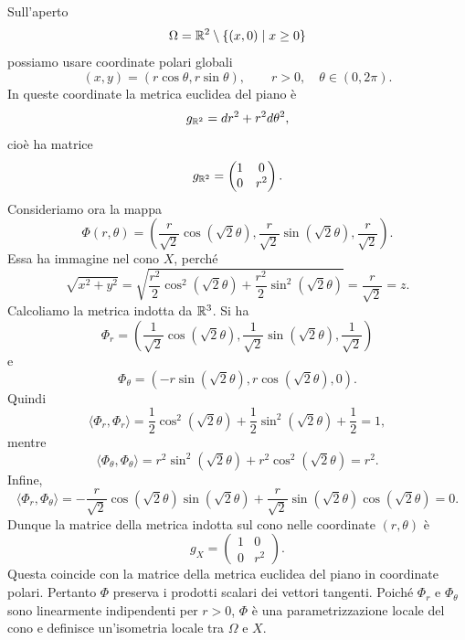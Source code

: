\documentclass[a4paper]{article}
\begin{document}
\begin{snippetsolution}{}
    Sull'aperto
    \[
        \Omega=\mathbb{R}^2\setminus\{(x,0)\mid x\geq0\}
    \]
    possiamo usare coordinate polari globali
    \[
        (x,y)=(r\cos\theta,r\sin\theta),
        \qquad
        r>0,\quad \theta\in(0,2\pi).
    \]
    In queste coordinate la metrica euclidea del piano è
    \[
        g_{\mathbb{R}^2}
        =
        dr^2+r^2d\theta^2,
    \]
    cioè ha matrice
    \[
        g_{\mathbb{R}^2}
        =
        \begin{pmatrix}
            1 & 0\\
            0 & r^2
        \end{pmatrix}.
    \]
    Consideriamo ora la mappa
    \[
        \Phi(r,\theta)
        =
        \left(
            \frac{r}{\sqrt{2}}\cos(\sqrt{2}\theta),
            \frac{r}{\sqrt{2}}\sin(\sqrt{2}\theta),
            \frac{r}{\sqrt{2}}
        \right).
    \]
    Essa ha immagine nel cono \(X\), perché
    \[
        \sqrt{x^2+y^2}
        =
        \sqrt{
            \frac{r^2}{2}\cos^2(\sqrt{2}\theta)
            +
            \frac{r^2}{2}\sin^2(\sqrt{2}\theta)
        }
        =
        \frac{r}{\sqrt{2}}
        =
        z.
    \]
    Calcoliamo la metrica indotta da \(\mathbb{R}^3\). Si ha
    \[
        \Phi_r
        =
        \left(
            \frac{1}{\sqrt{2}}\cos(\sqrt{2}\theta),
            \frac{1}{\sqrt{2}}\sin(\sqrt{2}\theta),
            \frac{1}{\sqrt{2}}
        \right)
    \]
    e
    \[
        \Phi_\theta
        =
        \left(
            -r\sin(\sqrt{2}\theta),
            r\cos(\sqrt{2}\theta),
            0
        \right).
    \]
    Quindi
    \[
        \langle\Phi_r,\Phi_r\rangle
        =
        \frac12\cos^2(\sqrt{2}\theta)
        +
        \frac12\sin^2(\sqrt{2}\theta)
        +
        \frac12
        =
        1,
    \]
    mentre
    \[
        \langle\Phi_\theta,\Phi_\theta\rangle
        =
        r^2\sin^2(\sqrt{2}\theta)
        +
        r^2\cos^2(\sqrt{2}\theta)
        =
        r^2.
    \]
    Infine,
    \[
        \langle\Phi_r,\Phi_\theta\rangle
        =
        -\frac{r}{\sqrt{2}}\cos(\sqrt{2}\theta)\sin(\sqrt{2}\theta)
        +
        \frac{r}{\sqrt{2}}\sin(\sqrt{2}\theta)\cos(\sqrt{2}\theta)
        =
        0.
    \]
    Dunque la matrice della metrica indotta sul cono nelle coordinate \((r,\theta)\) è
    \[
        g_X
        =
        \begin{pmatrix}
            1 & 0\\
            0 & r^2
        \end{pmatrix}.
    \]
    Questa coincide con la matrice della metrica euclidea del piano in coordinate polari. Pertanto \(\Phi\) preserva i prodotti scalari dei vettori tangenti. Poiché \(\Phi_r\) e \(\Phi_\theta\) sono linearmente indipendenti per \(r>0\), \(\Phi\) è una parametrizzazione locale del cono e definisce un'isometria locale tra \(\Omega\) e \(X\).
\end{snippetsolution}
\end{document}
